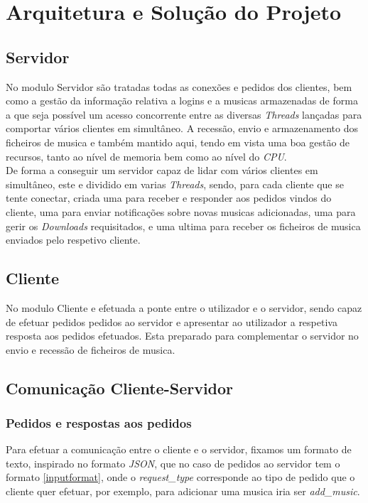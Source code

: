 \documentclass[a4paper]{report}
\begin{document}
\chapter{Arquitetura e Solução do Projeto}
\section{Servidor}
No modulo Servidor são tratadas todas as conexões e pedidos dos clientes, bem
como a gestão da informação relativa a logins e a musicas armazenadas de 
forma a que seja possível um acesso concorrente entre as diversas 
\textit{Threads} lançadas para comportar vários clientes em simultâneo.
A recessão, envio e armazenamento dos ficheiros de musica e também mantido aqui,
tendo em vista uma boa gestão de recursos, tanto ao nível de memoria bem como
ao nível do \textit{CPU}.\\
De forma a conseguir um servidor capaz de lidar com vários clientes em
simultâneo, este e dividido em varias \textit{Threads}, sendo, para cada
cliente que se tente conectar, criada uma para receber e responder aos
pedidos vindos do cliente, uma para enviar notificações sobre novas musicas
adicionadas, uma para gerir os \textit{Downloads} requisitados, e uma ultima
para receber os ficheiros de musica enviados pelo respetivo cliente.

\section{Cliente}
No modulo Cliente e efetuada a ponte entre o utilizador e o servidor, sendo 
capaz de efetuar pedidos pedidos ao servidor e apresentar ao utilizador a
respetiva resposta aos pedidos efetuados. Esta preparado para complementar
o servidor no envio e recessão de ficheiros de musica.

\section{Comunicação Cliente-Servidor}
\subsection{Pedidos e respostas aos pedidos}
Para efetuar a comunicação entre o cliente e o servidor, fixamos
um formato de texto, inspirado no formato \textit{JSON}, que no caso
de pedidos ao servidor tem o formato \ref{inputformat}, onde o 
\textit{request\_type} corresponde ao tipo de pedido que o cliente quer
efetuar, por exemplo, para adicionar uma musica iria ser \textit{add\_music}.\\
\end{document}
